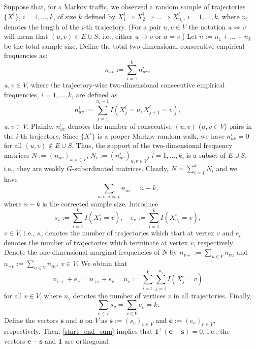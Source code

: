 \documentclass[b5paper,12pt]{report}
\theoremstyle{definition}
\newcommand{\be}{\boldsymbol{e}}
\newcommand{\bs}{\boldsymbol{s}}
\begin{document}
Suppose that, for a Markov traffic, we observed a random sample of trajectories  $\{X^i\}$, $i=1,\ldots,k$, of size $k$ defined by $X_1^i\Rightarrow X_2^i\Rightarrow\ldots\Rightarrow X_{n_i}^i$, $i=1,\ldots,k$, where $n_i$ denotes the length of the $i$-th trajectory. (For a pair $u,v\in V$ the notation $u\Rightarrow v$ will mean that $(u,v)\in E\cup S$, i.e., either $u\rightarrow v$ or $u=v$.) Let $n:=n_1+\ldots +n_k$ be the total sample size. Define the total two-dimensional consecutive empirical frequencies as:
\begin{equation}\label{2freq}
    n_{uv}:= \sum_{i=1}^k n_{uv}^i,
\end{equation}     
$u,v\in V$, where the trajectory-wise two-dimensional consecutive empirical frequencies, $i=1,\ldots,k$, are defined as
\[
    n_{uv}^i := \sum_{j=1}^{n_i-1} I(X_j^i=u,X_{j+1}^i=v),
\] 
$u,v\in V$. Plainly, $n_{uv}^i$ denotes the number of consecutive $(u,v)$ ($u,v\in V$) pairs in the $i$-th trajectory. Since $\{X^i\}$ is a proper Markov random walk, we have $n_{uv}^i=0$ for all $(u,v)\notin E\cup S$. Thus, the support of the two-dimensional frequency matrices $N:=(n_{uv})_{u,v\in V}$, $N_i:=(n_{uv}^i)_{u,v\in V}$, $i=1,\ldots,k$, is a subset of $E\cup S$, i.e., they are weakly $G$-subordinated matrices. Clearly, $N= \sum_{i=1}^k N_i$ and we have
\begin{equation}\label{corr_sample_size}
    \sum_{u,v:u\Rightarrow v} n_{uv} = n-k,
\end{equation}
where $n-k$ is the corrected sample size. Introduce
\[
    s_v := \sum_{i=1}^k I(X_1^i=v), \quad
          e_v := \sum_{i=1}^k I(X_{n_i}^i = v),
\] 
$v\in V$, i.e., $s_v$ denotes the number of trajectories which start at vertex $v$ and $e_v$ denotes the number of trajectories which terminate at vertex $v$, respectively. Denote the one-dimensional marginal frequencies of $N$ by $n_{v+}:=\sum_{u\in V} n_{vu}$ and $n_{+v}:=\sum_{u\in V} n_{uv}$, $v\in V$. We obtain that
\begin{equation}\label{start_end}
    n_{v+}+e_v = n_{+v} + s_v = n_v :=\sum_{i=1}^k \sum_{j=1}^{n_i} I(X_j^i=v)
\end{equation} 
for all $v\in V$, where $n_v$ denotes the number of vertices $v$ in all trajectories. Finally,
\begin{equation}\label{start_end_sum}        
    \sum_{v\in V}  s_v = \sum_{v\in V}  e_v = k.
\end{equation} 
Define the vectors $\bs$ and $\be$ on $V$ as $\bs:=(s_v)_{v\in V}$ and $\be:=(e_v)_{v\in V}$, respectively. Then, \eqref{start_end_sum} implies that $\textbf{1}^\top (\be -\bs) = 0$, i.e., the vectors $\be -\bs$ and $\textbf{1}$ are orthogonal.
\end{document}
